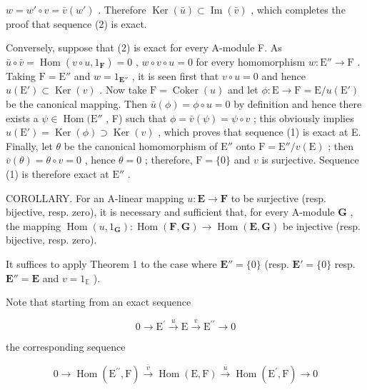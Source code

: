 \(w = w' \circ v = \bar{v}(w')\) . Therefore \(\operatorname{Ker}(\bar{u}) \subset \operatorname{Im}(\bar{v})\) , which completes the proof that sequence (2) is exact.

Conversely, suppose that (2) is exact for every A-module F. As \(\bar{u} \circ \bar{v} = \operatorname{Hom}(v \circ u, 1_{\mathbf{F}}) = 0\) , \(w \circ v \circ u = 0\) for every homomorphism \(w: \mathrm{E}'' \to \mathrm{F}\) . Taking \(\mathrm{F} = \mathrm{E}''\) and \(w = 1_{\mathbf{E}''}\) , it is seen first that \(v \circ u = 0\) and hence \(u(\mathrm{E}') \subset \operatorname{Ker}(v)\) . Now take \(\mathrm{F} = \operatorname{Coker}(u)\) and let \(\phi: \mathrm{E} \to \mathrm{F} = \mathrm{E}/u(\mathrm{E}')\) be the canonical mapping. Then \(\bar{u}(\phi) = \phi \circ u = 0\) by definition and hence there exists a \(\psi \in \operatorname{Hom}(\mathrm{E}''\) , F) such that \(\phi = \bar{v}(\psi) = \psi \circ v\) ; this obviously implies \(u(\mathrm{E}') = \operatorname{Ker}(\phi) \supset \operatorname{Ker}(v)\) , which proves that sequence (1) is exact at E. Finally, let \(\theta\) be the canonical homomorphism of \(\mathrm{E}''\) onto \(\mathrm{F} = \mathrm{E}''/v(\mathrm{E})\) ; then \(\bar{v}(\theta) = \theta \circ v = 0\) , hence \(\theta = 0\) ; therefore, \(\mathrm{F} = \{0\}\) and \(v\) is surjective. Sequence (1) is therefore exact at \(\mathrm{E}''\) .

COROLLARY. For an A-linear mapping \(u: \mathbf{E} \to \mathbf{F}\) to be surjective (resp. bijective, resp. zero), it is necessary and sufficient that, for every A-module \(\mathbf{G}\) , the mapping \(\operatorname{Hom}(u, 1_{\mathbf{G}}): \operatorname{Hom}(\mathbf{F}, \mathbf{G}) \to \operatorname{Hom}(\mathbf{E}, \mathbf{G})\) be injective (resp. bijective, resp. zero).

It suffices to apply Theorem 1 to the case where \(\mathbf{E}'' = \{0\}\) (resp. \(\mathbf{E}' = \{0\}\) resp. \(\mathbf{E}'' = \mathbf{E}\) and \(v = 1_{\mathbb{E}}\) ).

Note that starting from an exact sequence

\[
0 \longrightarrow \mathrm{E} ^ {\prime} \stackrel {u} {\longrightarrow} \mathrm{E} \stackrel {v} {\longrightarrow} \mathrm{E} ^ {\prime \prime} \longrightarrow 0
\]

the corresponding sequence

\[
0 \longrightarrow \operatorname{Hom} (\mathrm{E} ^ {\prime \prime}, \mathrm{F}) \stackrel {\bar {v}} {\longrightarrow} \operatorname{Hom} (\mathrm{E}, \mathrm{F}) \stackrel {\bar {u}} {\longrightarrow} \operatorname{Hom} (\mathrm{E} ^ {\prime}, \mathrm{F}) \longrightarrow 0
\]

